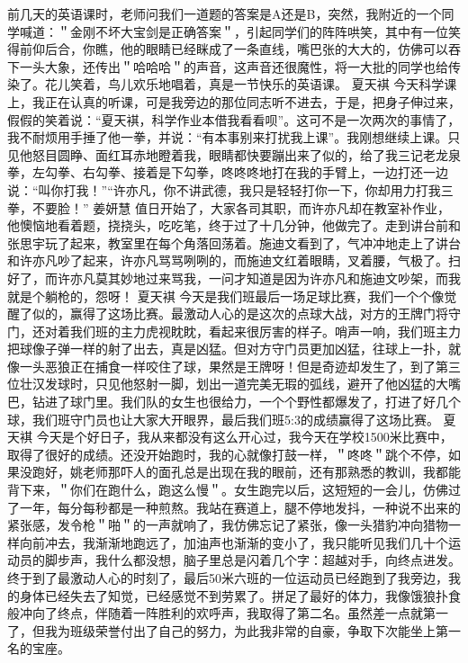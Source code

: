 {}前几天的英语课时，老师问我们一道题的答案是A还是B，突然，我附近的一个同学喊道：＂金刚不坏大宝剑是正确答案＂，引起同学们的阵阵哄笑，其中有一位笑得前仰后合，你瞧，他的眼睛已经眯成了一条直线，嘴巴张的大大的，仿佛可以吞下一头大象，还传出＂哈哈哈＂的声音，这声音还很魔性，将一大批的同学也给传染了。花儿笑着，鸟儿欢乐地唱着，真是一节快乐的英语课。\markdownRendererInterblockSeparator
{}\markdownRendererInterblockSeparator
{}夏天褀\markdownRendererInterblockSeparator
{}今天科学课上，我正在认真的听课，可是我旁边的那位同志听不进去，于是，把身子伸过来，假假的笑着说：“夏天褀，科学作业本借我看看呗”。这可不是一次两次的事情了，我不耐烦用手捶了他一拳，并说：“有本事别来打扰我上课”。我刚想继续上课。只见他怒目圆睁、面红耳赤地瞪着我，眼睛都快要蹦出来了似的，给了我三记老龙泉拳，左勾拳、右勾拳、接着是下勾拳，咚咚咚地打在我的手臂上，一边打还一边说：“叫你打我！”“许亦凡，你不讲武德，我只是轻轻打你一下，你却用力打我三拳，不要脸！”\markdownRendererInterblockSeparator
{}\markdownRendererInterblockSeparator
{}姜妍慧\markdownRendererInterblockSeparator
{}值日开始了，大家各司其职，而许亦凡却在教室补作业，他懊恼地看着题，挠挠头，吃吃笔，终于过了十几分钟，他做完了。走到讲台前和张思宇玩了起来，教室里在每个角落回荡着。施迪文看到了，气冲冲地走上了讲台和许亦凡吵了起来，许亦凡骂骂咧咧的，而施迪文红着眼睛，叉着腰，气极了。扫好了，而许亦凡莫其妙地过来骂我，一问才知道是因为许亦凡和施迪文吵架，而我就是个躺枪的，怨呀！\markdownRendererInterblockSeparator
{}\markdownRendererInterblockSeparator
{}夏天褀\markdownRendererInterblockSeparator
{}今天是我们班最后一场足球比赛，我们一个个像觉醒了似的，赢得了这场比赛。最激动人心的是这次的点球大战，对方的王牌门将守门，还对着我们班的主力虎视眈眈，看起来很厉害的样子。哨声一响，我们班主力把球像子弹一样的射了出去，真是凶猛。但对方守门员更加凶猛，往球上一扑，就像一头恶狼正在捕食一样咬住了球，果然是王牌呀！但是奇迹却发生了，到了第三位壮汉发球时，只见他怒射一脚，划出一道完美无瑕的弧线，避开了他凶猛的大嘴巴，钻进了球门里。我们队的女生也很给力，一个个野性都爆发了，打进了好几个球，我们班守门员也让大家大开眼界，最后我们班5:3的成绩赢得了这场比赛。\markdownRendererInterblockSeparator
{}\markdownRendererInterblockSeparator
{}夏天褀\markdownRendererInterblockSeparator
{}今天是个好日子，我从来都没有这么开心过，我今天在学校1500米比赛中，取得了很好的成绩。还没开始跑时，我的心就像打鼓一样，＂咚咚＂跳个不停，如果没跑好，姚老师那吓人的面孔总是出现在我的眼前，还有那熟悉的教训，我都能背下来，＂你们在跑什么，跑这么慢＂。女生跑完以后，这短短的一会儿，仿佛过了一年，每分每秒都是一种煎熬。我站在赛道上，腿不停地发抖，一种说不出来的紧张感，发令枪＂啪＂的一声就响了，我仿佛忘记了紧张，像一头猎豹冲向猎物一样向前冲去，我渐渐地跑远了，加油声也渐渐的变小了，我只能听见我们几十个运动员的脚步声，我什么都没想，脑子里总是闪着几个字：超越对手，向终点进发。终于到了最激动人心的时刻了，最后50米六班的一位运动员已经跑到了我旁边，我的身体已经失去了知觉，已经感觉不到劳累了。拼足了最好的体力，我像饿狼扑食般冲向了终点，伴随着一阵胜利的欢呼声，我取得了第二名。虽然差一点就第一了，但我为班级荣誉付出了自己的努力，为此我非常的自豪，争取下次能坐上第一名的宝座。\markdownRendererInterblockSeparator
